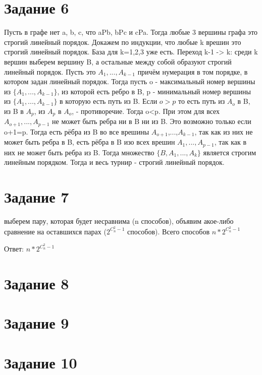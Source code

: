 \documentclass[a4paper, 12pt]{article}
\begin{document}
	\section*{Задание 6}
		Пусть в графе нет a, b, c, что aPb, bPc и cPa. Тогда любые 3 вершины графа это строгий линейный порядок. Докажем по индукции, что любые k врешин это строгий линейный порядок. База для k=1,2,3 уже есть. Переход k-1 -> k: среди k вершин выберем вершину B, а остальные между собой образуют строгий линейный порядок. Пусть это $A_1,...,A_{k-1}$ причём нумерация в том порядке, в котором задан линейный порядок. Тогда пусть o - максимальный номер вершины из $\{A_1,...,A_{k-1}\}$, из которой есть ребро в B, p - минимальный номер вершины из $\{A_1,...,A_{k-1}\}$ в которую есть путь из B. Если $o>p$ то есть путь из $A_o$ в B, из B в $A_p$, из $A_p$ в $A_o$, - противоречие.
		Тогда o<p. При этом для всех $A_{o+1},...,A_{p-1}$ не может быть ребра ни в B ни из B. Это возможно только если o+1=p. Тогда есть рёбра из B во все врешины $A_{o+1}$,...,$A_{k-1}$, так как из них не может быть ребра в B, есть рёбра в B изо всех врешин $A_{1},...,A_{p-1}$, так как в них не может быть ребра из B. Тогда множество $\{B,A_1,...,A_k\}$ является строгим линейным порядком. Тогда и весь турнир - строгий линейный порядок.
	\section*{Задание 7}
		выберем пару, которая будет несравнима (n способов), объявим акое-либо сравнение на оставшихся парах ($2^{C_n^2-1}$ способов). Всего способов $n*2^{C_n^2-1}$

		Ответ: $n*2^{C_n^2-1}$
	\section*{Задание 8}
	\section*{Задание 9}
	\section*{Задание 10}
\end{document}
